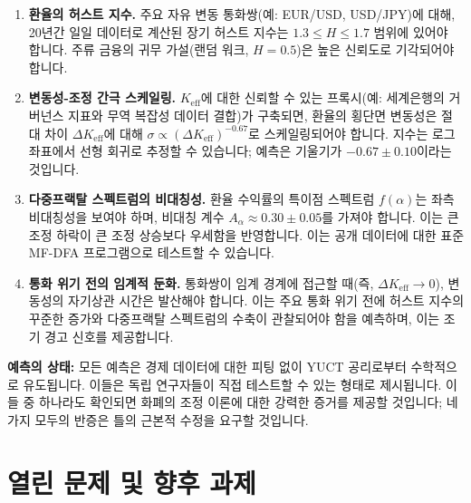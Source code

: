 \documentclass[12pt,a4paper]{article}
\theoremstyle{remark}
\begin{document}
	\begin{enumerate}[label=(\arabic*)]
		\item \textbf{환율의 허스트 지수.} 주요 자유 변동 통화쌍(예: EUR/USD, USD/JPY)에 대해, 20년간 일일 데이터로 계산된 장기 허스트 지수는 \(1.3 \le H \le 1.7\) 범위에 있어야 합니다. 주류 금융의 귀무 가설(랜덤 워크, \(H = 0.5\))은 높은 신뢰도로 기각되어야 합니다.
		
		\item \textbf{변동성-조정 간극 스케일링.} \(K_{\mathrm{eff}}\)에 대한 신뢰할 수 있는 프록시(예: 세계은행의 거버넌스 지표와 무역 복잡성 데이터 결합)가 구축되면, 환율의 횡단면 변동성은 절대 차이 \(\Delta K_{\mathrm{eff}}\)에 대해 \(\sigma \propto (\Delta K_{\mathrm{eff}})^{-0.67}\)로 스케일링되어야 합니다. 지수는 로그 좌표에서 선형 회귀로 추정할 수 있습니다; 예측은 기울기가 \(-0.67 \pm 0.10\)이라는 것입니다.
		
		\item \textbf{다중프랙탈 스펙트럼의 비대칭성.} 환율 수익률의 특이점 스펙트럼 \(f(\alpha)\)는 좌측 비대칭성을 보여야 하며, 비대칭 계수 \(A_\alpha \approx 0.30 \pm 0.05\)를 가져야 합니다. 이는 큰 조정 하락이 큰 조정 상승보다 우세함을 반영합니다. 이는 공개 데이터에 대한 표준 MF-DFA 프로그램으로 테스트할 수 있습니다.
		
		\item \textbf{통화 위기 전의 임계적 둔화.} 통화쌍이 임계 경계에 접근할 때(즉, \(\Delta K_{\mathrm{eff}} \to 0\)), 변동성의 자기상관 시간은 발산해야 합니다. 이는 주요 통화 위기 전에 허스트 지수의 꾸준한 증가와 다중프랙탈 스펙트럼의 수축이 관찰되어야 함을 예측하며, 이는 조기 경고 신호를 제공합니다.
	\end{enumerate}
	
	\textbf{예측의 상태:} 모든 예측은 경제 데이터에 대한 피팅 없이 YUCT 공리로부터 수학적으로 유도됩니다. 이들은 독립 연구자들이 직접 테스트할 수 있는 형태로 제시됩니다. 이들 중 하나라도 확인되면 화폐의 조정 이론에 대한 강력한 증거를 제공할 것입니다; 네 가지 모두의 반증은 틀의 근본적 수정을 요구할 것입니다.
	
	\section{열린 문제 및 향후 과제}
	
\end{document}
